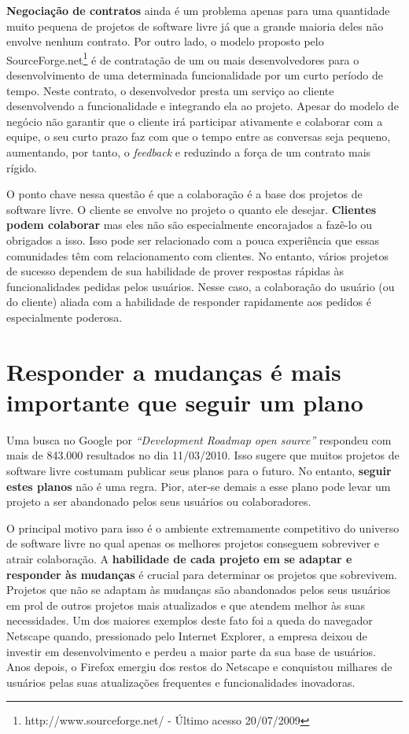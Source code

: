 \textbf{Negociação de contratos} ainda é um problema apenas para uma
quantidade muito pequena de projetos de software livre já que a grande
maioria deles não envolve nenhum contrato.  Por outro lado, o modelo
proposto pelo SourceForge.net\footnote{http://www.sourceforge.net/ -
  Último acesso 20/07/2009} é de contratação de um ou mais
desenvolvedores para o desenvolvimento de uma determinada
funcionalidade por um curto período de tempo. Neste contrato, o
desenvolvedor presta um serviço ao cliente desenvolvendo a
funcionalidade e integrando ela ao projeto. Apesar do modelo de
negócio não garantir que o cliente irá participar ativamente e
colaborar com a equipe, o seu curto prazo faz com que o tempo entre as
conversas seja pequeno, aumentando, por tanto, o \emph{feedback} e
reduzindo a força de um contrato mais rígido.

O ponto chave nessa questão é que a colaboração é a base dos projetos
de software livre.  O cliente se envolve no projeto o quanto ele
desejar. \textbf{Clientes podem colaborar} mas eles não são
especialmente encorajados a fazê-lo ou obrigados a isso. Isso pode ser
relacionado com a pouca experiência que essas comunidades têm com
relacionamento com clientes. No entanto, vários projetos de sucesso
dependem de sua habilidade de prover respostas rápidas às
funcionalidades pedidas pelos usuários. Nesse caso, a colaboração do
usuário (ou do cliente) aliada com a habilidade de responder
rapidamente aos pedidos é especialmente poderosa.

\section{Responder a mudanças é mais importante que seguir um plano}
\label{sec:fourth-princ}

Uma busca no Google por \emph{``Development Roadmap open source''}
respondeu com mais de 843.000 resultados no dia 11/03/2010. Isso
sugere que muitos projetos de software livre costumam publicar seus
planos para o futuro. No entanto, \textbf{seguir estes planos} não é
uma regra. Pior, ater-se demais a esse plano pode levar um projeto a
ser abandonado pelos seus usuários ou colaboradores.

O principal motivo para isso é o ambiente extremamente competitivo do
universo de software livre no qual apenas os melhores projetos
conseguem sobreviver e atrair colaboração. A \textbf{habilidade de
  cada projeto em se adaptar e responder às mudanças} é crucial para
determinar os projetos que sobrevivem.  Projetos que não se adaptam às
mudanças são abandonados pelos seus usuários em prol de outros
projetos mais atualizados e que atendem melhor às suas necessidades.
Um dos maiores exemplos deste fato foi a queda do navegador Netscape
quando, pressionado pelo Internet Explorer, a empresa deixou de
investir em desenvolvimento e perdeu a maior parte da sua base de
usuários. Anos depois, o Firefox emergiu dos restos do Netscape e
conquistou milhares de usuários pelas suas atualizações frequentes e
funcionalidades inovadoras.

